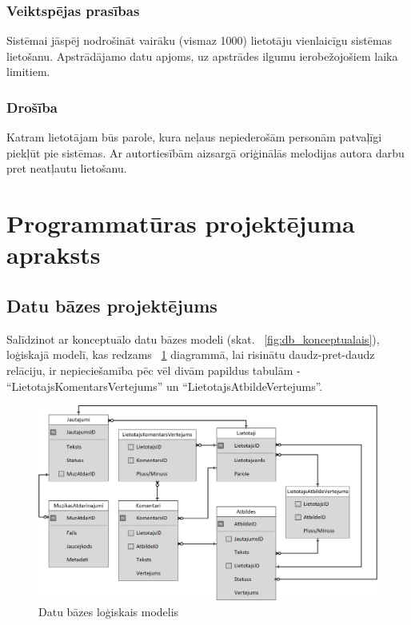 \documentclass[12pt]{article}
\begin{document}
\subsubsection{Veiktspējas prasības}

Sistēmai jāspēj nodrošināt vairāku (vismaz 1000) lietotāju vienlaicīgu sistēmas lietošanu. Apstrādājamo datu apjoms, uz apstrādes ilgumu ierobežojošiem laika limitiem.

\subsubsection{Drošība}

Katram lietotājam būs parole, kura neļaus nepiederošām personām patvaļīgi piekļūt pie sistēmas. Ar autortiesībām aizsargā oriģinālās melodijas autora darbu pret neatļautu lietošanu.

\section{Programmatūras projektējuma apraksts}

\subsection{Datu bāzes projektējums}

Salīdzinot ar konceptuālo datu bāzes modeli (skat. ~\ref{fig:db_konceptualais}), loģiskajā modelī, kas redzams ~\ref{fig:db_logiskais} diagrammā, lai risinātu daudz-pret-daudz relāciju, ir nepieciešamība pēc vēl divām papildus tabulām - ``LietotajsKomentarsVertejums'' un ``LietotajsAtbildeVertejums''.

\begin{figure}[H]
\begin{center}
	\includegraphics[scale=0.4]{DB_logical.png}
	\caption{Datu bāzes loģiskais modelis}
	\label{fig:db_logiskais}
\end{center}
\end{figure}
\end{document}
